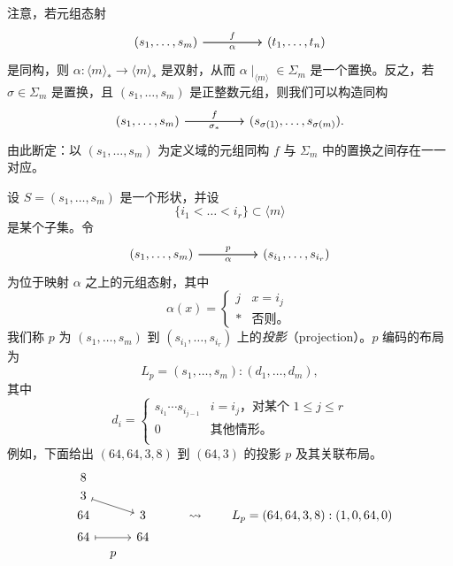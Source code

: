 \begin{observation}\label{isomorphismsvspermutations}\label{definitionofpermutation}
    注意，若元组态射
    \[\begin{tikzcd} (s_1,\dots,s_m) \ar[rr,"f"] \ar[rr,swap,"\alpha"] & &  (t_1,\dots,t_n)
    \end{tikzcd} \]
    是同构，则 $\alpha : \langle m \rangle_* \to \langle m \rangle_*$ 是双射，从而 $\alpha \mid_{\langle m \rangle} \in \Sigma_m$ 是一个置换。反之，若 $\sigma \in \Sigma_m$ 是置换，且 $(s_1,\dots,s_m)$ 是正整数元组，则我们可以构造同构
    \[\begin{tikzcd} (s_1,\dots,s_m) \ar[rr,"f"] \ar[rr,swap,"\sigma_*"] & &  (s_{\sigma(1)},\dots,s_{\sigma(m)}).
    \end{tikzcd} \]
    由此断定：以 $(s_1,\dots,s_m)$ 为定义域的元组同构 $f$ 与 $\Sigma_m$ 中的置换之间存在一一对应。
\end{observation}



\begin{example}[投影] \label{definitionofprojection} 设 $S = (s_1,\dots,s_m)$ 是一个形状，并设
\[\{i_1<\dots<i_r\} \subset \langle m \rangle\]
是某个子集。令
\[\begin{tikzcd} (s_1,\dots,s_m) \ar[rr,"p"] \ar[rr,swap,"\alpha"] & &  (s_{i_1},\dots,s_{i_r})
    \end{tikzcd} \]
为位于映射 $\alpha$ 之上的元组态射，其中
\[
\alpha(x) =
\begin{cases}
    j & x = i_j\\
    * & \text{否则。}
\end{cases}
\]
我们称 $p$ 为 $(s_1,\dots,s_m)$ 到 $(s_{i_1},\dots,s_{i_r})$ 上的{\it 投影}（projection）。$p$ 编码的布局为
\[L_p = (s_1,\dots,s_m):(d_1,\dots,d_m),
\]
其中
\[
d_i = \begin{cases}
    s_{i_1}\cdots s_{i_{j-1}} & i = i_j \text{，对某个 }1 \leq j \leq r\\
    0 & \text{其他情形。}\\
\end{cases}
\]
例如，下面给出 $(64,64,3,8)$ 到 $(64,3)$ 的投影 $p$ 及其关联布局。
    \[
    \begin{tikzcd}[row sep = 1, column sep = 8]
    & 8 & &  &  & & & & \\
    & 3 \ar[rrd, mapsto] & & & & & & & \\
    & 64 & & 3 & & & \rightsquigarrow & & L_p = (64,64,3,8):(1,0,64,0) \\
    & 64 \ar[rr,mapsto] & & 64 & & & & & \\
    & & p & & & & & & \\
    \end{tikzcd}
\]
\end{example}

